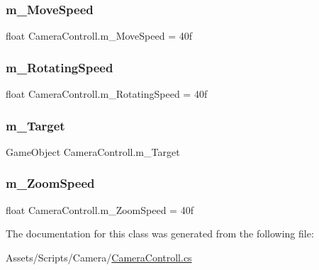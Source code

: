 \subsubsection{\texorpdfstring{m\_MoveSpeed}{m\_MoveSpeed}}
{\footnotesize\ttfamily float Camera\+Controll.\+m\+\_\+\+Move\+Speed = 40f}

\mbox{\label{class_camera_controll_a78986d85b7e4cc0edd711d814ae0a2c1}} 
\subsubsection{\texorpdfstring{m\_RotatingSpeed}{m\_RotatingSpeed}}
{\footnotesize\ttfamily float Camera\+Controll.\+m\+\_\+\+Rotating\+Speed = 40f}

\mbox{\label{class_camera_controll_a780ffba01532dd926e98880f51d9d443}} 
\subsubsection{\texorpdfstring{m\_Target}{m\_Target}}
{\footnotesize\ttfamily Game\+Object Camera\+Controll.\+m\+\_\+\+Target}

\mbox{\label{class_camera_controll_a49e1e88b1bf4bf23317ed22ee190c2c4}} 
\subsubsection{\texorpdfstring{m\_ZoomSpeed}{m\_ZoomSpeed}}
{\footnotesize\ttfamily float Camera\+Controll.\+m\+\_\+\+Zoom\+Speed = 40f}



The documentation for this class was generated from the following file\+:\begin{DoxyCompactItemize}
\item 
Assets/\+Scripts/\+Camera/\mbox{\hyperlink{_camera_controll_8cs}{Camera\+Controll.\+cs}}\end{DoxyCompactItemize}
